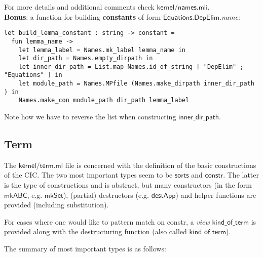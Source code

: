 \documentclass[a4paper,oneside]{book}
\newcommand{\m}[1]{\ensuremath{\mathsf{#1}}}
\begin{document}
\noindent
For more details and additional comments check \m{kernel/names.mli}. \\

\noindent
\textbf{Bonus}: a function for building \textbf{constants} of form
\m{Equations.DepElim}.\emph{name}:

\begin{lstlisting}
let build_lemma_constant : string -> constant =
  fun lemma_name ->
    let lemma_label = Names.mk_label lemma_name in
    let dir_path = Names.empty_dirpath in
    let inner_dir_path = List.map Names.id_of_string [ "DepElim" ; "Equations" ] in
    let module_path = Names.MPfile (Names.make_dirpath inner_dir_path ) in
    Names.make_con module_path dir_path lemma_label
\end{lstlisting}
Note how we have to reverse the list when constructing \m{inner\_dir\_path}.

\subsection{Term}

The \m{kernel/term.ml} file is concerned with the definition of the
basic constructions of the CIC. The two most important types seem to
be \m{sorts} and \m{constr}. The latter is the type of constructions
and is abstract, but many constructors (in the form \m{mkABC},
e.g. \m{mkSet}), (partial) destructors (e.g. \m{destApp}) and helper
functions are provided (including substitution). 

For cases where one would like to pattern match on constr, a
\emph{view} \m{kind\_of\_term} is provided along with the
destructuring function (also called \m{kind\_of\_term}).

The summary of most important types is as follows:
\end{document}
